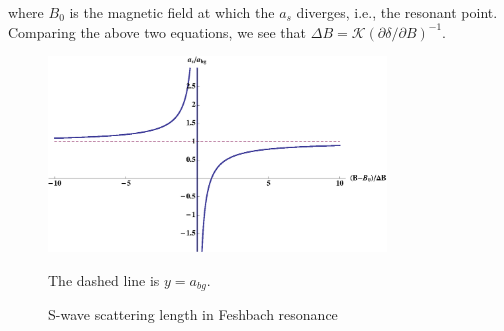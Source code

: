 where $B_{0}$ is the magnetic field at which the $a_{s}$ diverges, i.e., the  resonant point.  Comparing the above two equations, we see that $\Delta{B}=\mathcal{K}(\partial\delta/\partial{B})^{-1}$.  %
\begin{figure}[htbp]
\begin{center}
\includegraphics[width=0.8\textwidth]{FeshbachAs}
\caption{S-wave scattering length in Feshbach resonance} 
\label{fig:intro:Feshbach}
{\small The dashed line is $y=a_{bg}$.}
\end{center}
\end{figure}

